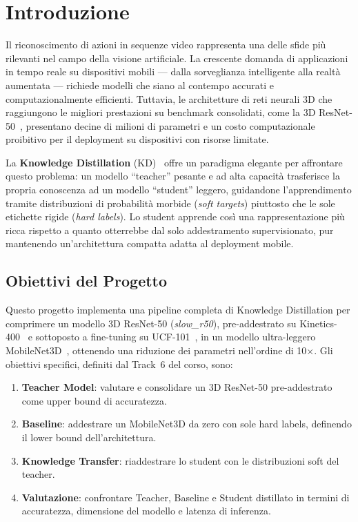 \chapter{Introduzione}

Il riconoscimento di azioni in sequenze video rappresenta una delle sfide più rilevanti nel campo della visione artificiale. La crescente domanda di applicazioni in tempo reale su dispositivi mobili --- dalla sorveglianza intelligente alla realtà aumentata --- richiede modelli che siano al contempo accurati e computazionalmente efficienti. Tuttavia, le architetture di reti neurali 3D che raggiungono le migliori prestazioni su benchmark consolidati, come la 3D ResNet-50~\cite{he2016deep,feichtenhofer2019slowfast}, presentano decine di milioni di parametri e un costo computazionale proibitivo per il deployment su dispositivi con risorse limitate.

La \textbf{Knowledge Distillation} (KD)~\cite{hinton2015distilling} offre un paradigma elegante per affrontare questo problema: un modello ``teacher'' pesante e ad alta capacità trasferisce la propria conoscenza ad un modello ``student'' leggero, guidandone l'apprendimento tramite distribuzioni di probabilità morbide (\textit{soft targets}) piuttosto che le sole etichette rigide (\textit{hard labels}). Lo student apprende così una rappresentazione più ricca rispetto a quanto otterrebbe dal solo addestramento supervisionato, pur mantenendo un'architettura compatta adatta al deployment mobile.

\section{Obiettivi del Progetto}

Questo progetto implementa una pipeline completa di Knowledge Distillation per comprimere un modello 3D ResNet-50 (\textit{slow\_r50}), pre-addestrato su Kinetics-400~\cite{kay2017kinetics} e sottoposto a fine-tuning su UCF-101~\cite{soomro2012ucf101}, in un modello ultra-leggero MobileNet3D~\cite{sandler2018mobilenetv2}, ottenendo una riduzione dei parametri nell'ordine di 10$\times$. Gli obiettivi specifici, definiti dal Track~6 del corso, sono:

\begin{enumerate}
    \item \textbf{Teacher Model}: valutare e consolidare un 3D ResNet-50 pre-addestrato come upper bound di accuratezza.
    \item \textbf{Baseline}: addestrare un MobileNet3D da zero con sole hard labels, definendo il lower bound dell'architettura.
    \item \textbf{Knowledge Transfer}: riaddestrare lo student con le distribuzioni soft del teacher.
    \item \textbf{Valutazione}: confrontare Teacher, Baseline e Student distillato in termini di accuratezza, dimensione del modello e latenza di inferenza.
\end{enumerate}

